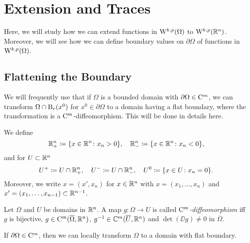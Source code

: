 \chapter{Extension and Traces}
\label{chap:extAndTrace}

Here, we will study how we can extend functions in $\mathrm{W}^{k,p}(\Omega)$ to $\mathrm{W}^{k,p}(\mathbb{R}^n)$.
Moreover, we will see how we can define boundary values on $\partial\Omega$ of functions in $\mathrm{W}^{k,p}(\Omega)$.

\section{Flattening the Boundary}

We will frequently use that if $\Omega$ is a bounded domain with $\partial\Omega \in \mathrm{C}^m$, we can transform $\Omega \cap \mathrm{B}_r(x^0)$ for $x^0 \in \partial\Omega$ to a domain having a flat boundary, where the transformation is a $\mathrm{C}^m$-diffeomorphism.
This will be done in details here.

\begin{ntion}
  We define 
  $$
  \mathbb{R}^n_+ \coloneqq \{x \in \mathbb{R}^n \colon x_n > 0 \}, \quad \mathbb{R}^n_-\coloneqq \{x \in \mathbb{R}^n \colon x_n < 0\},
  $$
  and for $U \subset \mathbb{R}^n$
  $$
  U^+ \coloneqq U \cap \mathbb{R}^n_+, \quad U^- \coloneqq U \cap \mathbb{R}^n_-, \quad U^0 \coloneqq \{x \in U \colon x_n = 0\}.
  $$
  Moreover, we write $x = (x', x_n)$ for $x \in \mathbb{R}^n$ with $x = (x_1,\dots,x_n)$ and $x' =(x_1, \dots, x_{n - 1}) \subset \mathbb{R}^{n - 1}$.
\end{ntion}

\begin{defn}
  \label{defn:CmDiffeo}
  Let $\Omega$ and $U$ be domains in $\mathbb{R}^n$.
  A map $g \colon \Omega \to U$ is called \emph{$\mathrm{C}^m$-diffeomorphism} iff $g$ is bijective, $g \in \mathrm{C}^m(\overline{\Omega},\mathbb{R}^n)$, $g^{-1} \in \mathbb{C}^m(\overline U, \mathbb{R}^n)$ and $\det(\DD g) \neq 0$ in $\overline \Omega$.
\end{defn}

If $\partial \Omega \in \mathrm{C}^m$, then we can locally transform $\Omega$ to a domain with flat boundary.

